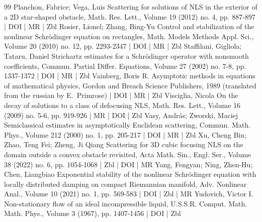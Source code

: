 \begin{thebibliography}{99}
Planchon, Fabrice; Vega, Luis Scattering for solutions of NLS in the exterior of a 2D star-shaped obstacle, Math. Res. Lett., Volume 19 (2012) no. 4, pp. 887-897 | DOI | MR | Zbl
Rosier, Lionel; Zhang, Bing-Yu Control and stabilization of the nonlinear Schrödinger equation on rectangles, Math. Models Methods Appl. Sci., Volume 20 (2010) no. 12, pp. 2293-2347 | DOI | MR | Zbl
Staffilani, Gigliola; Tataru, Daniel Strichartz estimates for a Schrödinger operator with nonsmooth coefficients, Commun. Partial Differ. Equations, Volume 27 (2002) no. 7-8, pp. 1337-1372 | DOI | MR | Zbl
Vainberg, Boris R. Asymptotic methods in equations of mathematical physics, Gordon and Breach Science Publishers, 1989 (translated from the russian by E. Primrose) | DOI | MR | Zbl
Visciglia, Nicola On the decay of solutions to a class of defocusing NLS, Math. Res. Lett., Volume 16 (2009) no. 5-6, pp. 919-926 | MR | DOI | Zbl
Vasy, András; Zworski, Maciej Semiclassical estimates in asymptotically Euclidean scattering, Commun. Math. Phys., Volume 212 (2000) no. 1, pp. 205-217 | DOI | MR | Zbl
Xu, Cheng Bin; Zhao, Teng Fei; Zheng, Ji Qiang Scattering for 3D cubic focusing NLS on the domain outside a convex obstacle revisited, Acta Math. Sin., Engl. Ser., Volume 38 (2022) no. 6, pp. 1054-1068 | Zbl | DOI | MR
Yang, Fengyan; Ning, Zhen-Hu; Chen, Liangbiao Exponential stability of the nonlinear Schrödinger equation with locally distributed damping on compact Riemannian manifold, Adv. Nonlinear Anal., Volume 10 (2021) no. 1, pp. 569-583 | DOI | Zbl | MR
Yudovich, Victor I. Non-stationary flow of an ideal incompressible liquid, U.S.S.R. Comput. Math. Math. Phys., Volume 3 (1967), pp. 1407-1456 | DOI | Zbl
\end{thebibliography}
